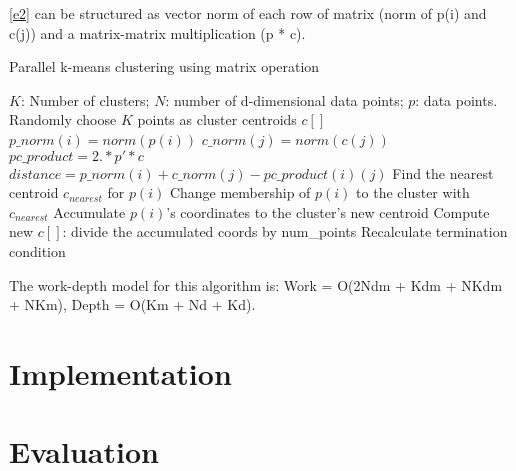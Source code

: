 \documentclass{article}
\begin{document}
\ref{e2} can be structured as vector norm of each row of matrix (norm of p(i) and c(j)) and
a matrix-matrix multiplication (p * c). 
\begin{algorithm}[!htp]
  \caption{Parallel k-means clustering using matrix operation} \label{par_m}
  \begin{algorithmic}[1]
    \INPUT $K$: Number of clusters; $N$: number of d-dimensional data points; $p$: data points.
     \label{alg:pm}
    \State Randomly choose $K$ points as cluster centroids $c[]$
    \State $p\_norm(i) = norm(p(i))$
    \EndFor
    \State $c\_norm(j) = norm(c(j))$
    \EndFor
    \State $pc\_product = 2 .* p' * c$
    \State $distance = p\_norm(i) + c\_norm(j) - pc\_product(i)(j)$
    \EndFor
    \State Find the nearest centroid $c_{nearest}$ for $p(i)$
    \State Change membership of $p(i)$ to the cluster with $c_{nearest}$
    \State Accumulate $p(i)$'s coordinates to the cluster's new centroid
    \EndParFor
    \State Compute new $c[]$: divide the accumulated coords by num\_points
    \State Recalculate termination condition
    \EndWhile
    \EndFunction
  \end{algorithmic}
\end{algorithm}
The work-depth model for this algorithm is: Work = O(2Ndm + Kdm + NKdm + NKm), Depth = O(Km + Nd + Kd).

\section{Implementation}

\section{Evaluation}



\end{document}
